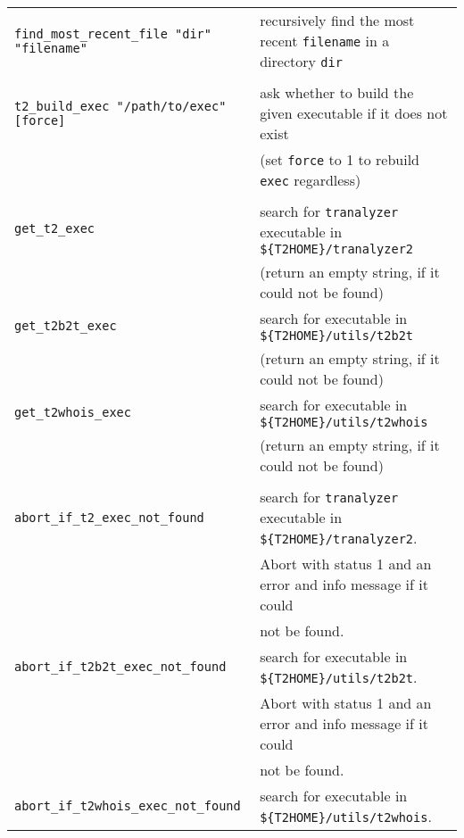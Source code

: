 \documentclass[documentation]{subfiles}
\begin{document}
\begin{longtable}{>{\tt}ll}
    find\_most\_recent\_file "dir" "filename"   & recursively find the most recent {\tt filename} in a directory {\tt dir}\\
                                                & \\
    t2\_build\_exec "/path/to/exec" [force]     & ask whether to build the given executable if it does not exist\\
                                                & (set {\tt force} to 1 to rebuild {\tt exec} regardless)\\
                                                & \\
    get\_t2\_exec                               & search for {\tt tranalyzer} executable in {\tt \$\{T2HOME\}/tranalyzer2}\\
                                                & (return an empty string, if it could not be found)\\
    get\_t2b2t\_exec                            & search for \nameref{t2b2t} executable in {\tt \$\{T2HOME\}/utils/t2b2t}\\
                                                & (return an empty string, if it could not be found)\\
    get\_t2whois\_exec                          & search for \nameref{t2whois} executable in {\tt \$\{T2HOME\}/utils/t2whois}\\
                                                & (return an empty string, if it could not be found)\\
                                                & \\
    abort\_if\_t2\_exec\_not\_found             & search for {\tt tranalyzer} executable in {\tt \$\{T2HOME\}/tranalyzer2}.\\
                                                & Abort with status 1 and an error and info message if it could\\
                                                & not be found.\\
    abort\_if\_t2b2t\_exec\_not\_found          & search for \nameref{t2b2t} executable in {\tt \$\{T2HOME\}/utils/t2b2t}.\\
                                                & Abort with status 1 and an error and info message if it could\\
                                                & not be found.\\
    abort\_if\_t2whois\_exec\_not\_found        & search for \nameref{t2whois} executable in {\tt \$\{T2HOME\}/utils/t2whois}.\\

\end{longtable}
\end{document}
